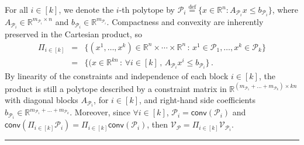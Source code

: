 \documentclass[twoside]{article}
\newcommand{\R}{\mathbb{R}}
\newcommand{\jmlrBlackBox}{\rule{1.5ex}{1.5ex}}
\newcommand{\jmlrQED}{\hfill\jmlrBlackBox\par\bigskip}
\providecommand{\proofname}{Proof}
\renewenvironment{proof}{\par\noindent{\bfseries\upshape \proofname\ }}{\jmlrQED}
\newcommand{\mP}{\mathcal{P}}
\newcommand{\mQ}{\mathcal{Q}}
\newcommand{\verts}[1]{\mathcal{V}_{#1}}
\newcommand{\conv}[1]{\mathsf{conv}\left(#1\right)}
\newcommand{\defi}{\stackrel{\mathrm{\scriptscriptstyle def}}{=}}
\begin{document}
\begin{proof}
For all $i \in [k]$, we denote the $i$-th polytope by $\mP_i \defi \{x \in \R^n : A_{\mP_i} x \le b_{\mP_i}\}$, where $A_{\mP_i} \in \R^{m_{\mP_i} \times n}$ and $b_{\mP_i} \in \R^{m_{\mP_i}}$. 
Compactness and convexity are inherently preserved in the Cartesian product, so
\[
\begin{array}{rcl}
\Pi_{i \in [k]} &=& \{(x^1, \dots, x^k) \in \R^n\times\cdots \times\R^n\,:\, x^1 \in \mP_1, \dots, x^k \in \mP_k\}\\
&=& \{(x \in \R^{kn}\,:\, \forall i \in [k]\,,\, A_{\mP_i} x^i \le b_{\mP_i}\}\,.
\end{array}
\]
By linearity of the constraints and independence of each block $i \in [k]$,
the product is still a polytope described by a constraint matrix in $\R^{(m_{\mP_1}+\dots+m_{\mP_k})\times kn}$ with diagonal blocks $A_{\mP_i}$, for $i \in [k]$, and right-hand side coefficients $b_{\mP_i} \in \R^{m_{\mP_1}+\dots+m_{\mP_k}}$.
Moreover, since $\forall i \in [k]$, $\mP_i = \conv{\mP_i}$ and $\conv{\Pi_{i \in [k]}\mP_i} = \Pi_{i \in [k]}\conv{\mP_i}$, then $\verts{\mP} = \Pi_{i \in [k]}\verts{\mP_i}$.

\end{proof}
\end{document}
